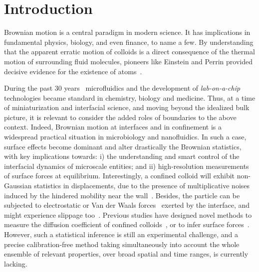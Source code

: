 \section{Introduction}
  \label{sec:Intro}



Brownian motion is a central paradigm in modern science. It has implications in fundamental physics, biology, and even finance, to name a few. By understanding that the apparent erratic motion of colloids is a direct consequence of the thermal motion of surrounding fluid molecules, pioneers like Einstein and Perrin provided decisive evidence for the existence of atoms~\cite{einstein_uber_1905,perrin_les_2014}.

During the past 30 years~\cite{whitesides_origins_2006, convery_30_2019} microfluidics and the development of \textit{lab-on-a-chip} technologies \cite{neuzil_revisiting_2012,ding_surface_2013} became standard in chemistry, biology and medicine. Thus, at a time of miniaturization and interfacial science, and moving beyond the idealized bulk picture, it is relevant to  consider the added roles of boundaries to the above context. Indeed, Brownian motion at interfaces and in confinement is a widespread practical situation in microbiology and nanofluidics. In such a case, surface effects become dominant and alter drastically the Brownian statistics, with key implications towards: i) the understanding and smart control of the interfacial dynamics of microscale entities; and ii) high-resolution measurements of surface forces at equilibrium. Interestingly, a confined colloid will exhibit non-Gaussian statistics in displacements, due to the presence of multiplicative noises induced by the hindered mobility near the wall~\cite{felderhof_effect_2005,wang_anomalous_2009,chechkin_brownian_2017}. Besides, the particle can be subjected to electrostatic or Van der Waals forces~\cite{bouzigues_nanofluidics_2008} exerted by the interface, and might experience slippage too~\cite{joly_probing_2006,mo_brownian_2017}. Previous studies have designed novel methods to measure the diffusion coefficient of confined colloids~\cite{faucheux_confined_1994,dufresne_brownian_2001,carbajal-tinoco_asymmetry_2007,eral_anisotropic_2010,sharma_high-precision_2010,mo_broadband_2015,matse_test_2017}, or to infer surface forces~\cite{prieve_measurement_1999,banerjee_experimental_2005,sainis_statistics_2007,volpe_influence_2010,wang_measurement_2011,li_subfemtonewton_2019}. However, such a statistical inference is still an experimental challenge, and a precise calibration-free method taking simultaneously into account the whole ensemble of relevant properties, over broad spatial and time ranges, is currently lacking.

